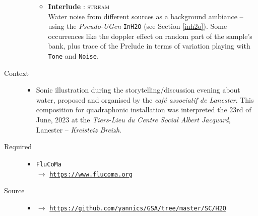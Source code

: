 \begin{description}
\begin{itemize}
\begin{itemize}[leftmargin=0.4in]
		\item \textbf{Interlude} : \textsc{stream} \\ Water noise from different sources as a background ambiance -- using the \textit{Pseudo-UGen} \texttt{InH2O} (see Section \ref{inh2o}). Some occurrences like the doppler effect on random part of the sample's bank, plus trace of the Prelude in terms of variation playing with \texttt{Tone} and \texttt{Noise}.
		\end{itemize}
	\end{itemize}

\item[Context] \hfill 
	\begin{itemize}
	\item[] Sonic illustration during the storytelling/discussion evening about water, proposed and organised by the \textit{café associatif de Lanester}. This composition for quadraphonic installation was interpreted the 23rd of June, 2023 at the \textit{Tiers-Lieu du Centre Social Albert Jacquard}, Lanester -- \textit{Kreisteiz Breizh}.
	\end{itemize}

\item[Required] \hfill 
\begin{itemize}
\setlength\itemsep{1em}
\item[] \texttt{FluCoMa} \\ $\rightarrow$ \href{https://www.flucoma.org}{\texttt{\small https://www.flucoma.org}}
\end{itemize}

\item[Source] \hfill 
\begin{itemize}
\item[] $\rightarrow$ \href{https://github.com/yannics/GSA/tree/master/SC/H2O}{\texttt{\small https://github.com/yannics/GSA/tree/master/SC/H2O}}  
\end{itemize}


\end{description}

